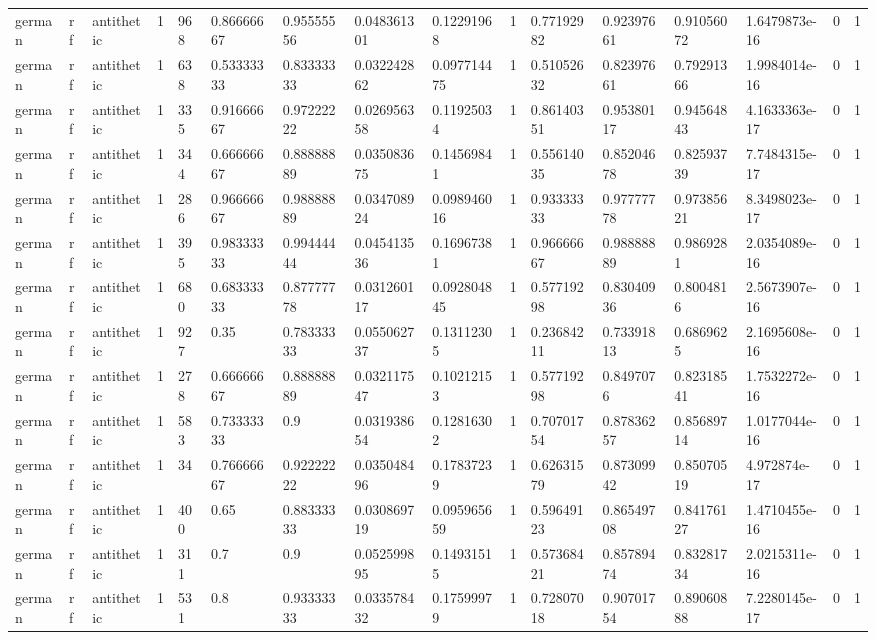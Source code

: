 \begin{tabular}{llllllllllllllll}
german & rf & antithetic & 1 & 968 & 0.86666667 & 0.95555556 & 0.048361301 & 0.12291968 & 1 & 0.77192982 & 0.92397661 & 0.91056072 & 1.6479873e-16 & 0 & 1 \\
german & rf & antithetic & 1 & 638 & 0.53333333 & 0.83333333 & 0.032242862 & 0.097714475 & 1 & 0.51052632 & 0.82397661 & 0.79291366 & 1.9984014e-16 & 0 & 1 \\
german & rf & antithetic & 1 & 335 & 0.91666667 & 0.97222222 & 0.026956358 & 0.11925034 & 1 & 0.86140351 & 0.95380117 & 0.94564843 & 4.1633363e-17 & 0 & 1 \\
german & rf & antithetic & 1 & 344 & 0.66666667 & 0.88888889 & 0.035083675 & 0.14569841 & 1 & 0.55614035 & 0.85204678 & 0.82593739 & 7.7484315e-17 & 0 & 1 \\
german & rf & antithetic & 1 & 286 & 0.96666667 & 0.98888889 & 0.034708924 & 0.098946016 & 1 & 0.93333333 & 0.97777778 & 0.97385621 & 8.3498023e-17 & 0 & 1 \\
german & rf & antithetic & 1 & 395 & 0.98333333 & 0.99444444 & 0.045413536 & 0.16967381 & 1 & 0.96666667 & 0.98888889 & 0.9869281 & 2.0354089e-16 & 0 & 1 \\
german & rf & antithetic & 1 & 680 & 0.68333333 & 0.87777778 & 0.031260117 & 0.092804845 & 1 & 0.57719298 & 0.83040936 & 0.8004816 & 2.5673907e-16 & 0 & 1 \\
german & rf & antithetic & 1 & 927 & 0.35 & 0.78333333 & 0.055062737 & 0.13112305 & 1 & 0.23684211 & 0.73391813 & 0.6869625 & 2.1695608e-16 & 0 & 1 \\
german & rf & antithetic & 1 & 278 & 0.66666667 & 0.88888889 & 0.032117547 & 0.10212153 & 1 & 0.57719298 & 0.8497076 & 0.82318541 & 1.7532272e-16 & 0 & 1 \\
german & rf & antithetic & 1 & 583 & 0.73333333 & 0.9 & 0.031938654 & 0.12816302 & 1 & 0.70701754 & 0.87836257 & 0.85689714 & 1.0177044e-16 & 0 & 1 \\
german & rf & antithetic & 1 & 34 & 0.76666667 & 0.92222222 & 0.035048496 & 0.17837239 & 1 & 0.62631579 & 0.87309942 & 0.85070519 & 4.972874e-17 & 0 & 1 \\
german & rf & antithetic & 1 & 400 & 0.65 & 0.88333333 & 0.030869719 & 0.095965659 & 1 & 0.59649123 & 0.86549708 & 0.84176127 & 1.4710455e-16 & 0 & 1 \\
german & rf & antithetic & 1 & 311 & 0.7 & 0.9 & 0.052599895 & 0.14931515 & 1 & 0.57368421 & 0.85789474 & 0.83281734 & 2.0215311e-16 & 0 & 1 \\
german & rf & antithetic & 1 & 531 & 0.8 & 0.93333333 & 0.033578432 & 0.17599979 & 1 & 0.72807018 & 0.90701754 & 0.89060888 & 7.2280145e-17 & 0 & 1 \\

\end{tabular}
